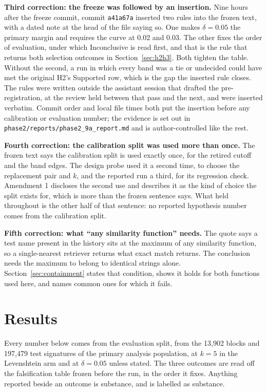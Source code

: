 \documentclass[11pt]{article}
\begin{document}
\textbf{Third correction: the freeze was followed by an insertion.} Nine hours
after the freeze commit, commit \texttt{a41a67a} inserted two rules into the
frozen text, with a dated note at the head of the file saying so. One makes
$\delta = 0.05$ the primary margin and requires the curve at 0.02 and 0.03.
The other fixes the order of evaluation, under which Inconclusive is read
first, and that is the rule that returns both selection outcomes in
Section~\ref{sec:h2h3}. Both tighten the table. Without the second, a run in
which every band was a tie or undecided could have met the original H2's
Supported row, which is the gap the inserted rule closes. The rules were
written outside the assistant session that drafted the pre-registration, at
the review held between that pass and the next, and were inserted verbatim.
Commit order and local file times both put the insertion before any
calibration or evaluation number; the evidence is set out in
\texttt{phase2/reports/phase2\_9a\_report.md} and is author-controlled like
the rest.

\textbf{Fourth correction: the calibration split was used more than once.}
The frozen text says the calibration split is used exactly once, for the
retired cutoff and the band edges. The design probe used it a second time, to
choose the replacement pair and $k$, and the reported run a third, for its
regression check. Amendment 1 discloses the second use and describes it as
the kind of choice the split exists for, which is more than the frozen
sentence says. What held throughout is the other half of that sentence: no
reported hypothesis number comes from the calibration split.

\textbf{Fifth correction: what ``any similarity function'' needs.} The quote
says a test name present in the history sits at the maximum of any similarity
function, so a single-nearest retriever returns what exact match returns. The
conclusion needs the maximum to belong to identical strings alone.
Section~\ref{sec:containment} states that condition, shows it holds for both
functions used here, and names common ones for which it fails.

\section{Results}
\label{sec:results}

Every number below comes from the evaluation split, from the 13{,}902 blocks
and 197{,}479 test signatures of the primary analysis population, at $k = 5$
in the Levenshtein arm and at $\delta = 0.05$ unless stated. The three
outcomes are read off the falsification table frozen before the run, in the
order it fixes. Anything reported beside an outcome is substance, and is
labelled as substance.
\end{document}
